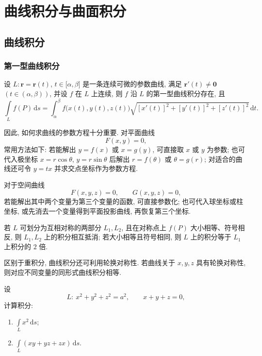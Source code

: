\documentclass[../数学分析培优讲义.tex]{subfiles}
\begin{document}
\setcounter{chapter}{12}
\pagestyle{fancy}

\chapter{曲线积分与曲面积分}


\section{曲线积分}


\subsection{第一型曲线积分}

\begin{theorem}
设 $L:\bm r=\bm r(t)$, $t\in\lbrack\alpha,\beta\rbrack$ 是一条连续可微的参数曲线, 满足 $\bm r'(t)\ne\bm0$ $(t\in(\alpha,\beta))$, 并设 $f$ 在 $L$ 上连续, 则 $f$ 沿 $L$ 的第一型曲线积分存在, 且
\[
    \int\limits_L f(P)\,\mathrm{d}s
    =\int_\alpha^\beta f\bigl(x(t),y(t),z(t)\bigr)
    \sqrt{[x'(t)]^2+[y'(t)]^2+[z'(t)]^2}\,\mathrm{d}t.
\]
\end{theorem}

因此, 如何求曲线的参数方程十分重要. 对平面曲线
\[
    F(x,y)=0,
\]
常用方法如下: 若能解出 $y=f(x)$ 或 $x=g(y)$, 可直接取 $x$ 或 $y$ 为参数; 也可代入极坐标 $x=r\cos\theta$, $y=r\sin\theta$ 后解出 $r=f(\theta)$ 或 $\theta=g(r)$; 对适合的曲线还可令 $y=tx$ 并求交点坐标作为参数方程.

对于空间曲线
\[
    F(x,y,z)=0,\qquad G(x,y,z)=0,
\]
若能解出其中两个变量为第三个变量的函数, 可直接参数化; 也可代入球坐标或柱坐标, 或先消去一个变量得到平面投影曲线, 再恢复第三个坐标.

\begin{theorem}
若 $L$ 可划分为互相对称的两部分 $L_1,L_2$, 且在对称点上 $f(P)$ 大小相等、符号相反, 则 $L_1,L_2$ 上的积分相互抵消; 若大小相等且符号相同, 则 $L$ 上的积分等于 $L_1$ 上积分的 $2$ 倍.
\end{theorem}

\begin{remark}
区别于重积分, 曲线积分还可利用轮换对称性. 若曲线关于 $x,y,z$ 具有轮换对称性, 则对应不同变量的同形式曲线积分相等.
\end{remark}

\begin{example}
设
\[
    L:\ x^2+y^2+z^2=a^2,\qquad x+y+z=0,
\]
计算积分:
\begin{enumerate}[label=(\arabic*)]
    \item $\displaystyle\int\limits_L x^2\,\mathrm{d}s$;
    \item $\displaystyle\int\limits_L(xy+yz+zx)\,\mathrm{d}s$.
\end{enumerate}
\end{example}
\exampleblank
\end{document}
